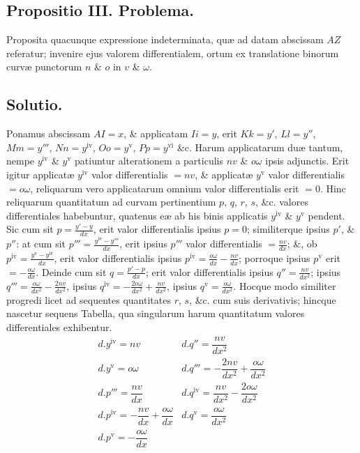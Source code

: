 \subsection*{Propositio III. Problema.}
Proposita quacunque expressione indeterminata, quæ ad datam abscissam $AZ$ referatur; invenire ejus valorem differentialem, ortum ex translatione binorum curvæ punctorum $n$ \& $o$ in $v$ \& $\omega$.

\subsection*{Solutio.}
Ponamus abscissam $AI=x$, \& applicatam $Ii=y$, erit $Kk=y'$, $Ll=y''$, $Mm=y'''$, $Nn=y^{\mathrm{iv}}$, $Oo=y^{\mathrm{v}}$, $Pp=y^{\mathrm{vi}}$ \&c. Harum applicatarum duæ tantum, nempe $y^{\mathrm{iv}}$ \& $y^{\mathrm{v}}$ patiuntur alterationem a particulis $nv$ \& $o\omega$ ipsis adjunctis. Erit igitur applicatæ $y^{\mathrm{iv}}$ valor differentialis $=nv$, \& applicatæ $y^{\mathrm{v}}$ valor differentialis $=o\omega$, reliquarum vero applicatarum omnium valor differentialis erit $=0$. Hinc reliquarum quantitatum ad curvam pertinentium $p$, $q$, $r$, $s$, \&c. valores differentiales habebuntur, quatenus eæ ab his binis applicatis $y^{\mathrm{iv}}$ \& $y^{\mathrm{v}}$ pendent. Sic cum sit $p=\frac{y'-y}{dx}$, erit valor differentialis ipsius $p=0$; similiterque ipsius $p'$, \& $p''$: at cum sit $p'''=\frac{y^{\mathrm{iv}}-y'''}{dx}$, erit ipsius $p'''$ valor differentialis $=\frac{nv}{dx}$; \&, ob $p^{\mathrm{iv}}=\frac{y^{\mathrm{v}}-y^{\mathrm{iv}}}{dx}$, erit valor differentialis ipsius $p^{\mathrm{iv}}=\frac{o\omega}{dx}-\frac{nv}{dx}$; porroque ipsius $p^{\mathrm{v}}$ erit $=-\frac{o\omega}{dx}$. Deinde cum sit
$q=\frac{p'-p}{dx}$; erit valor differentialis ipsius $q''=\frac{nv}{dx^2}$; ipsius $q'''=\frac{o\omega}{dx^2}-\frac{2nv}{dx^2}$, ipsius $q^{\mathrm{iv}}=-\frac{2o\omega}{dx^2}+\frac{nv}{dx^2}$, ipsius $q^{\mathrm{v}}=\frac{o\omega}{dx^2}$. Hocque modo similiter progredi licet ad sequentes quantitates $r$, $s$, \&c. cum suis derivativis; hincque nascetur sequens Tabella, qua singularum harum quantitatum valores differentiales exhibentur.
\[
\renewcommand{\arraystretch}{1.7}
\begin{array}{l|l}
d.y^{\mathrm{iv}}=nv&d.q''=\dfrac{nv}{dx^2}\\
d.y^{\mathrm{v}}=o\omega&d.q'''=-\dfrac{2nv}{dx^2}+\dfrac{o\omega}{dx^2}\\
d.p'''=\dfrac{nv}{dx}&d.q^{\mathrm{iv}}=\dfrac{nv}{dx^2}-\dfrac{2o\omega}{dx^2}\\
d.p^{\mathrm{iv}}=-\dfrac{nv}{dx}+\dfrac{o\omega}{dx}&d.q^{\mathrm{v}}=\dfrac{o\omega}{dx^2}\\
d.p^{\mathrm{v}}=-\dfrac{o\omega}{dx}&
\end{array}
\]
